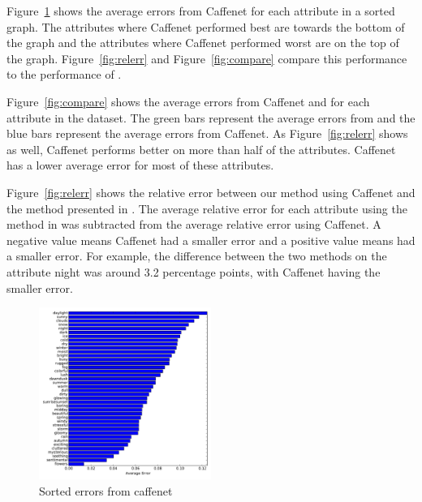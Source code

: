 \documentclass{article}
\newcommand{\figref}[1]{Figure~\ref{fig:#1}}
\begin{document}
\figref{sort} shows the average errors from Caffenet for each attribute
in a sorted graph.  The attributes where Caffenet performed best are towards
the bottom of the graph and the attributes where Caffenet performed
worst are on the top of the graph. \figref{relerr} and \figref{compare} 
compare this performance to the performance of \cite{Laffont14}.

\figref{compare} shows the average errors from Caffenet and \cite{Laffont14}
for each attribute in the dataset.  The green bars represent the average errors
from \cite{Laffont14} and the blue bars represent the average errors from Caffenet.
As \figref{relerr} shows as well, Caffenet performs better on more than half of 
the attributes.  Caffenet has a lower average error for most of these attributes.

\figref{relerr} shows the relative error between our method using Caffenet
and the method presented in \cite{Laffont14}.  The average relative error 
for each attribute using the method in \cite{Laffont14} was subtracted from
the average relative error using Caffenet.  A negative value means Caffenet
had a smaller error and a positive value means \cite{Laffont14} had a smaller
error.  For example, the difference between the two methods on the attribute
night was around 3.2 percentage points, with Caffenet having the smaller 
error.

 
 
%
%
%


\begin{figure}[t]
	\centering
		\includegraphics[width=0.5\textwidth]{figs/sorted_err.pdf}
		\caption{Sorted errors from caffenet}\label{fig:sort}
\end{figure}
\end{document}
